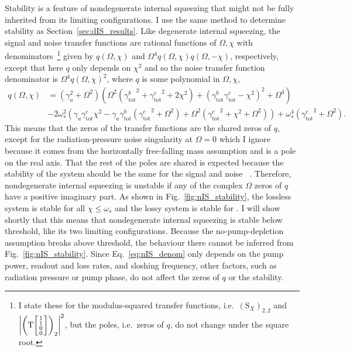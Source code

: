 Stability is a feature of nondegenerate internal squeezing that might not be fully inherited from its limiting configurations. I use the same method to determine stability as Section~\ref{sec:dIS_results}. Like degenerate internal squeezing, the signal and noise transfer functions are rational functions of $\Omega, \chi$ with denominators~\footnote{I state these for the modulus-squared transfer functions, i.e.\ $(\text{S}_X)_{2,2}$ and $\abs{\left(\text{T}\begin{bsmallmatrix}1 \\1\\0\\0\end{bsmallmatrix}\right)_2}^2$, but the poles, i.e.\ zeros of $q$, do not change under the square root.} given by $q(\Omega,\chi)$ and $\Omega^4 q(\Omega,\chi) q(\Omega,-\chi)$, respectively, except that here $q$ only depends on $\chi^2$ and so the noise transfer function denominator is $\Omega^4 q(\Omega,\chi)^2$, where $q$ is some polynomial in $\Omega, \chi$, 
\begin{align}\label{eq:nIS_denom}
q(\Omega,\chi)&=\left(\gamma_a^2+\Omega ^2\right) \left(\Omega ^2 \left({\gamma^b_\text{tot}}^2+{\gamma^c_\text{tot}}^2+2 \chi ^2\right)+\left({\gamma^b_\text{tot}} {\gamma^c_\text{tot}}-\chi ^2\right)^2+\Omega ^4\right)\\
&-2 \omega_s^2 \left(\gamma_a {\gamma^c_\text{tot}} \chi ^2-\gamma_a {\gamma^b_\text{tot}} \left({\gamma^c_\text{tot}}^2+\Omega ^2\right)+\Omega ^2 \left({\gamma^c_\text{tot}}^2+\chi ^2+\Omega ^2\right)\right)+\omega_s^4 \left({\gamma^c_\text{tot}}^2+\Omega ^2\right).
\end{align}
This means that the zeros of the transfer functions are the shared zeros of $q$, except for the radiation-pressure noise singularity at $\Omega=0$ which I ignore because it comes from the horizontally free-falling mass assumption and is a pole on the real axis. That the rest of the poles are shared is expected because the stability of the system should be the same for the signal and noise ~\cite{}.
Therefore, nondegenerate internal squeezing is unstable if any of the complex $\Omega$ zeros of $q$ have a positive imaginary part. As shown in Fig.~\ref{fig:nIS_stability}, the lossless system is stable for all $\chi\leq\omega_s$ and the lossy system is stable for . I will show shortly that this means that nondegenerate internal squeezing is stable below threshold, like its two limiting configurations. Because the no-pump-depletion assumption breaks above threshold, the behaviour there cannot be inferred from Fig.~\ref{fig:nIS_stability}.
Since Eq.~\ref{eq:nIS_denom} only depends on the pump power, readout and loss rates, and sloshing frequency, other factors, such as radiation pressure or pump phase, do not affect the zeros of $q$ or the stability.

